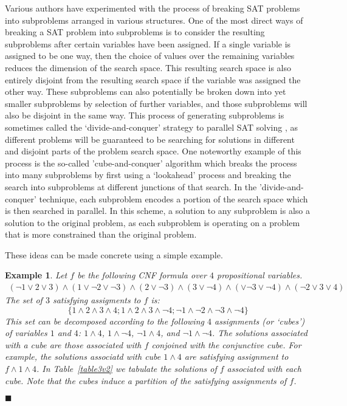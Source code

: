 \documentclass[
10pt, %
a4paper, %
oneside, %
headinclude,footinclude, %
BCOR5mm, %
]{scrartcl}
\begin{document}
Various authors have experimented with the process of breaking SAT problems into subproblems arranged in various structures.
One of the most direct ways of breaking a SAT problem into subproblems is to consider the resulting subproblems after certain variables have been assigned.
If a single variable is assigned to be one way, then the choice of values over the remaining variables reduces the dimension of the search space.
This resulting search space is also entirely disjoint from the resulting search space if the variable was assigned the other way.
These subproblems can also potentially be broken down into yet smaller subproblems by selection of further variables, and those subproblems will also be disjoint in the same way.
This process of generating subproblems is sometimes called the `divide-and-conquer' strategy to parallel SAT solving \cite{DBLP:journals/aim/HamadiW13}, as different problems will be
guaranteed to be searching for solutions in different and disjoint parts of the problem search space.
One noteworthy example of this process is the so-called 'cube-and-conquer' algorithm \cite{cube_and_conquer1} which breaks the process into 
many subproblems by first using a `lookahead' process \cite{lookahead_sat_solvers1} and breaking the search into subproblems at different junctions of that search.
In the 'divide-and-conquer' technique, each subproblem encodes a portion of the search space which is then searched in parallel. In this scheme,
a solution to any subproblem is also a solution to the original problem, as each subproblem is operating on a problem that is more constrained than the original problem.

These ideas can be made concrete using a simple example.

\newtheorem{myeg}{Example}
\begin{myeg} \label{eg:cubes}
  Let $f$ be the following CNF formula over $4$ propositional variables. 
  \[
  \begin{array}{c}
    ( \neg 1 \lor 2 \lor 3) \land  (1 \lor \neg 2 \lor \neg 3 ) \land ( 2 \lor \neg 3 ) \land ( 3 \lor \neg 4 ) \land ( \lor \neg 3 \lor \neg 4 ) \land ( \neg 2 \lor 3 \lor 4 )
  \end{array}
  \]
  The set of $3$ satisfying assigments to $f$ is:
  \[
  \{1 \land 2 \land 3 \land 4 ;
  1 \land 2 \land 3 \land \neg 4 ;
  \neg 1 \land \neg 2 \land \neg 3 \land \neg 4 \}\]
  This set can be decomposed according to the following $4$ assignments (or `cubes') of variables $1$ and $4$: $1\land 4$, $1\land \neg 4$,  $\neg 1\land 4$,  and $\neg 1\land \neg 4$.
  The solutions associated with a cube are those associated with $f$ conjoined with the conjunctive cube.
  For example, the solutions associatd with cube $1\land 4$ are satisfying assignment to $f \land 1 \land 4$.
  In Table~\ref{table3v2} we tabulate the solutions of $f$ associated with each cube.
  Note that the cubes induce a partition of the satisfying assignments of $f$.
  \begin{flushright}$\blacksquare$\end{flushright}
\end{myeg}
\end{document}
